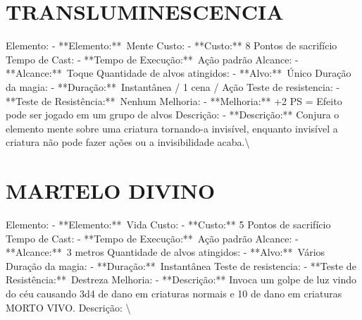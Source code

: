 \documentclass{article}%
\begin{document}
\section{TRANSLUMINESCENCIA}%
\label{sec:TRANSLUMINESCENCIA}%
Elemento: {-} **Elemento:**~Mente\newline%
Custo: {-} **Custo:** 8 Pontos de sacrifício\newline%
Tempo de Cast: {-} **Tempo de Execução:**~Ação padrão\newline%
Alcance: {-} **Alcance:**~Toque\newline%
Quantidade de alvos atingidos: {-} **Alvo:**~Único\newline%
Duração da magia: {-} **Duração:**~Instantânea / 1 cena / Ação\newline%
Teste de resistencia: {-} **Teste de Resistência:**~Nenhum\newline%
Melhoria: {-} **Melhoria:** +2 PS = Efeito pode ser jogado em um grupo de alvos\newline%
Descrição: {-} **Descrição:** Conjura o elemento mente sobre uma criatura tornando{-}a invisível, enquanto invisível a criatura não pode fazer ações ou a invisibilidade acaba.\textbackslash{}

%
\section{MARTELO DIVINO}%
\label{sec:MARTELODIVINO}%
Elemento: {-} **Elemento:**~Vida\newline%
Custo: {-} **Custo:** 5 Pontos de sacrifício\newline%
Tempo de Cast: {-} **Tempo de Execução:**~Ação padrão\newline%
Alcance: {-} **Alcance:**~3 metros\newline%
Quantidade de alvos atingidos: {-} **Alvo:**~Vários\newline%
Duração da magia: {-} **Duração:**~Instantânea\newline%
Teste de resistencia: {-} **Teste de Resistência:**~Destreza\newline%
Melhoria: {-} **Descrição:** Invoca um golpe de luz vindo do céu causando 3d4 de dano em criaturas normais e 10 de dano em criaturas MORTO VIVO.\newline%
Descrição: \textbackslash{}

%
\end{document}
